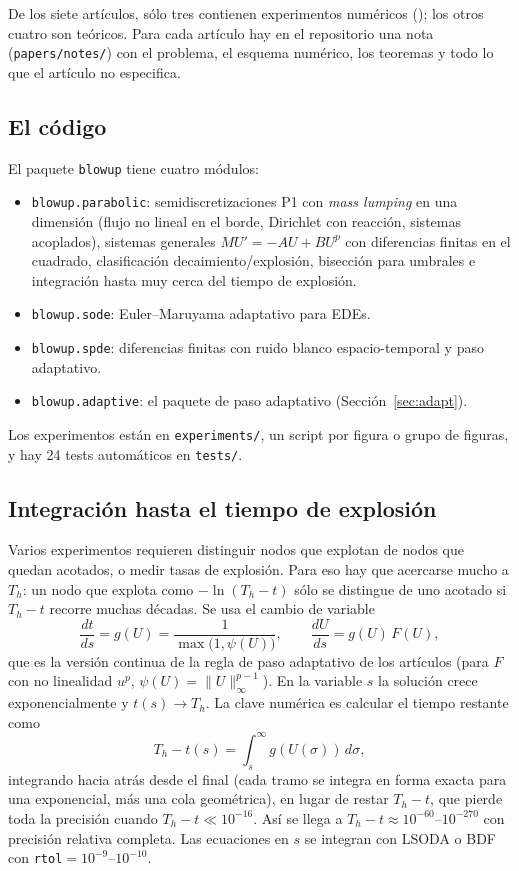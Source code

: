 \documentclass[11pt,a4paper]{article}
\newcommand{\code}[1]{\texttt{#1}}
\begin{document}
De los siete artículos, sólo tres contienen experimentos numéricos
(\cite{AFR,DFGRS,FG}); los otros cuatro son teóricos. Para cada artículo
hay en el repositorio una nota (\code{papers/notes/}) con el problema, el
esquema numérico, los teoremas y todo lo que el artículo no especifica.

\subsection{El código}

El paquete \code{blowup} tiene cuatro módulos:
\begin{itemize}
\item \code{blowup.parabolic}: semidiscretizaciones P1 con
\emph{mass lumping} en una dimensión (flujo no lineal en el borde, Dirichlet
con reacción, sistemas acoplados), sistemas generales $MU'=-AU+BU^p$ con
diferencias finitas en el cuadrado, clasificación decaimiento/explosión,
bisección para umbrales e integración hasta muy cerca del tiempo de
explosión.
\item \code{blowup.sode}: Euler--Maruyama adaptativo para EDEs.
\item \code{blowup.spde}: diferencias finitas con ruido blanco
espacio-temporal y paso adaptativo.
\item \code{blowup.adaptive}: el paquete de paso adaptativo
(Sección~\ref{sec:adapt}).
\end{itemize}
Los experimentos están en \code{experiments/}, un script por figura o grupo
de figuras, y hay 24 tests automáticos en \code{tests/}.

\subsection{Integración hasta el tiempo de explosión}\label{sec:rescaling}

Varios experimentos requieren distinguir nodos que explotan de nodos que
quedan acotados, o medir tasas de explosión. Para eso hay que acercarse
mucho a $T_h$: un nodo que explota como $-\ln(T_h-t)$ sólo se distingue de
uno acotado si $T_h-t$ recorre muchas décadas. Se usa el cambio de variable
\[
\frac{dt}{ds}=g(U)=\frac{1}{\max\big(1,\psi(U)\big)},\qquad
\frac{dU}{ds}=g(U)\,F(U),
\]
que es la versión continua de la regla de paso adaptativo de los artículos
(para $F$ con no linealidad $u^p$, $\psi(U)=\|U\|_\infty^{p-1}$). En la
variable $s$ la solución crece exponencialmente y $t(s)\to T_h$. La clave
numérica es calcular el tiempo restante como
\[
T_h-t(s)=\int_s^\infty g(U(\sigma))\,d\sigma,
\]
integrando hacia atrás desde el final (cada tramo se integra en forma exacta
para una exponencial, más una cola geométrica), en lugar de restar
$T_h-t$, que pierde toda la precisión cuando $T_h-t\ll10^{-16}$. Así se
llega a $T_h-t\approx10^{-60}$--$10^{-270}$ con precisión relativa
completa. Las ecuaciones en $s$ se integran con LSODA o BDF con
\code{rtol}$=10^{-9}$--$10^{-10}$.
\end{document}
